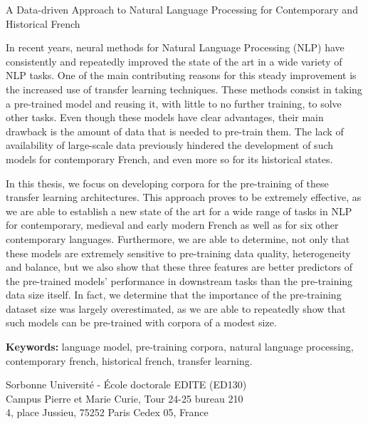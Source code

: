 \begin{center}
    A Data-driven Approach to Natural Language Processing for Contemporary and Historical French
\end{center}

\begingroup
\scriptsize
In recent years, neural methods for Natural Language Processing (NLP) have consistently and repeatedly improved the state of the art in a wide variety of NLP tasks. One of the main contributing reasons for this steady improvement is the increased use of transfer learning techniques. These methods consist in taking a pre-trained model and reusing it, with little to no further training, to solve other tasks. Even though these models have clear advantages, their main drawback is the amount of data that is needed to pre-train them. The lack of availability of large-scale data previously hindered the development of such models for contemporary French, and even more so for its historical states.

In this thesis, we focus on developing corpora for the pre-training of these transfer learning architectures. This approach proves to be extremely effective, as we are able to establish a new state of the art for a wide range of tasks in NLP for contemporary, medieval and early modern French as well as for six other contemporary languages. Furthermore, we are able to determine, not only that these models are extremely sensitive to pre-training data quality, heterogeneity and balance, but we also show that these three features are better predictors of the pre-trained models' performance in downstream tasks than the pre-training data size itself. In fact, we determine that the importance of the pre-training dataset size was largely overestimated, as we are able to repeatedly show that such models can be pre-trained with corpora of a modest size.

\textbf{Keywords:} language model, pre-training corpora, natural language processing, contemporary french, historical french, transfer learning.
\endgroup

\vfill

\begin{center}
    Sorbonne Université - École doctorale EDITE (ED130)\\
    Campus Pierre et Marie Curie, Tour 24-25 bureau 210\\
    4, place Jussieu, 75252 Paris Cedex 05, France
\end{center}